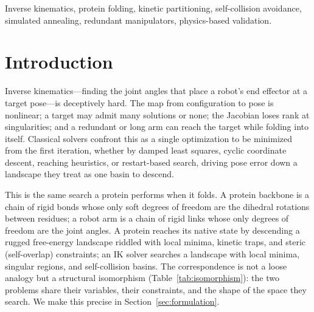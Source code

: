 \documentclass[10pt,conference]{IEEEtran}
\begin{document}
\begin{abstract}
milliseconds (worst p99 4.7\,ms, below TRAC-IK's 5.1\,ms). On self-collision
KineticFold is the cleanest of the field on the non-redundant arm, a ranking
rather than an absolute, while on the redundant Franka a spare joint lets every
method dodge and the edge does not carry over. Our results are validated
against two independent physics simulators (PyBullet and MuJoCo): our forward
kinematics agree with both to within a micron, and both engines
corroborate---and shrink---our self-collision claims. The advantage is largest
where the arm is most protein-like: on a planar arm lengthened from 4 to 16
joints, KineticFold's single-shot clean-solve rate---target reached and
self-collision-free---leads both production baselines at every chain length, and
the margin widens as the chain grows, reaching 10.4$\times$ over TRAC-IK and
3.5$\times$ over Multi-start at sixteen joints ($n = 1000$ per cell, 5000 at
sixteen; Fisher exact $p < 0.05$ in every cell). A restart oracle confirms that clean folds remain
available across that range, so the widening margin measures the growing
difficulty of \emph{finding} a clean fold rather than its disappearance.
\end{abstract}

\begin{IEEEkeywords}
Inverse kinematics, protein folding, kinetic partitioning, self-collision
avoidance, simulated annealing, redundant manipulators, physics-based
validation.
\end{IEEEkeywords}

\section{Introduction}
\label{sec:intro}

Inverse kinematics---finding the joint angles that place a robot's end effector
at a target pose---is deceptively hard. The map from configuration to pose is
nonlinear; a target may admit many solutions or none; the Jacobian loses rank at
singularities; and a redundant or long arm can reach the target while folding
into itself. Classical solvers confront this as a single optimization to be
minimized from the first iteration, whether by damped least squares, cyclic
coordinate descent, reaching heuristics, or restart-based search, driving pose
error down a landscape they treat as one basin to descend.

This is the same search a protein performs when it folds. A protein backbone is
a chain of rigid bonds whose only soft degrees of freedom are the dihedral
rotations between residues; a robot arm is a chain of rigid links whose only
degrees of freedom are the joint angles. A protein reaches its native state by
descending a rugged free-energy landscape riddled with local minima, kinetic
traps, and steric (self-overlap) constraints; an IK solver searches a landscape
with local minima, singular regions, and self-collision basins. The
correspondence is not a loose analogy but a structural isomorphism
(Table~\ref{tab:isomorphism}): the two problems share their variables, their
constraints, and the shape of the space they search. We make this precise in
Section~\ref{sec:formulation}.
\end{document}
